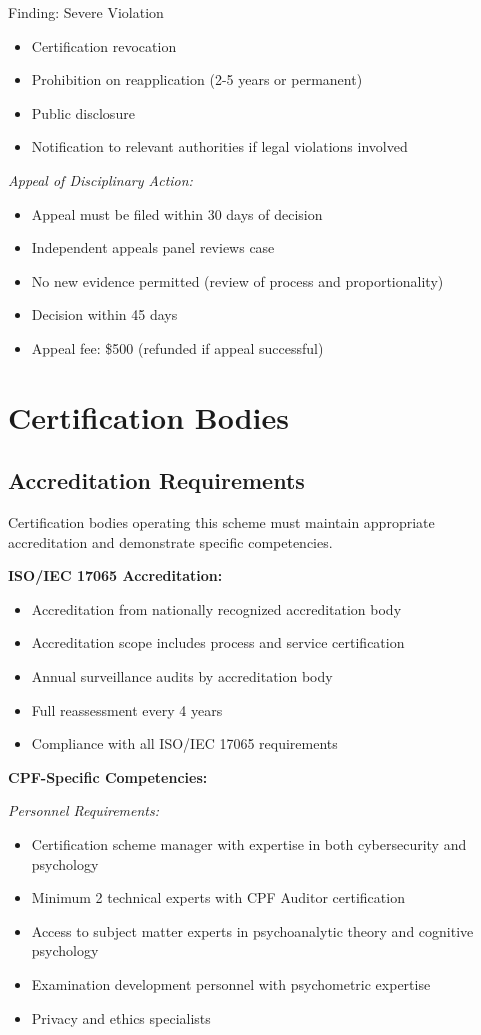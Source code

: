 \documentclass[11pt,a4paper]{article}
\begin{document}
Finding: Severe Violation
\begin{itemize}
\item Certification revocation
\item Prohibition on reapplication (2-5 years or permanent)
\item Public disclosure
\item Notification to relevant authorities if legal violations involved
\end{itemize}

\textit{Appeal of Disciplinary Action:}
\begin{itemize}
\item Appeal must be filed within 30 days of decision
\item Independent appeals panel reviews case
\item No new evidence permitted (review of process and proportionality)
\item Decision within 45 days
\item Appeal fee: \$500 (refunded if appeal successful)
\end{itemize}

\section{Certification Bodies}

\subsection{Accreditation Requirements}

Certification bodies operating this scheme must maintain appropriate accreditation and demonstrate specific competencies.

\textbf{ISO/IEC 17065 Accreditation:}
\begin{itemize}
\item Accreditation from nationally recognized accreditation body
\item Accreditation scope includes process and service certification
\item Annual surveillance audits by accreditation body
\item Full reassessment every 4 years
\item Compliance with all ISO/IEC 17065 requirements
\end{itemize}

\textbf{CPF-Specific Competencies:}

\textit{Personnel Requirements:}
\begin{itemize}
\item Certification scheme manager with expertise in both cybersecurity and psychology
\item Minimum 2 technical experts with CPF Auditor certification
\item Access to subject matter experts in psychoanalytic theory and cognitive psychology
\item Examination development personnel with psychometric expertise
\item Privacy and ethics specialists
\end{itemize}
\end{document}
